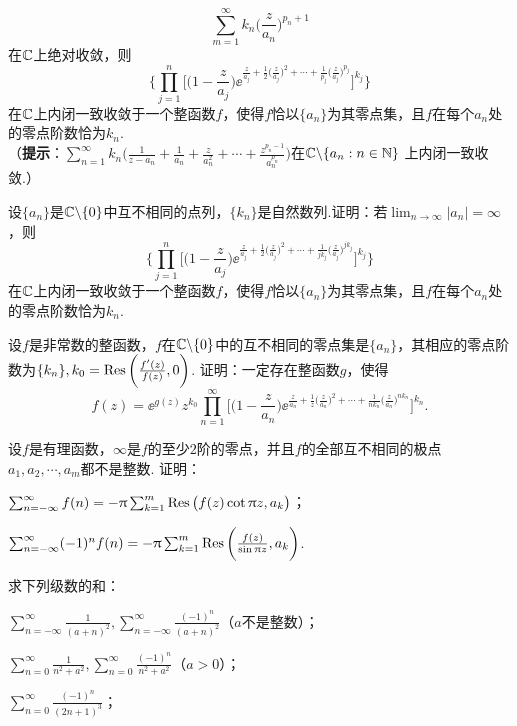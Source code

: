 \begin{xiti}
\[        \sum_{m=1}^\infty k_n\bigg(\frac z{a_n}\bigg)^{p_n+1}
      \]
      在$\mathbb C$上绝对收敛，则
      \[
        \bigg\{\prod_{j=1}^n\bigg[\bigg(1-\frac z{a_j}\bigg)\ee^{\frac z{a_j}+\frac12\big(\frac z{a_j}\big)^2+\cdots+\frac1{p_j}\big(\frac z{a_j}\big)^{p_j}}\bigg]^{k_j}\bigg\}
      \]
      在$\mathbb C$上内闭一致收敛于一个整函数$f$，使得$f$恰以$\{a_n\}$为其零点集，且$f$在每个$a_n$处的零点阶数恰为$k_n$.\\
      （\textbf{提示}：$\sum_{n=1}^\infty k_n\bigg(\frac1{z-a_n}+\frac1{a_n}
      +\frac z{a_n^2}+\cdots+\frac{z^{p_n-1}}{a_n^{p_n}}\bigg)$在$\mathbb C\backslash\{a_n:n\in\mathbb N\}$
      上内闭一致收敛.）
  \item 设$\{a_n\}$是$\mathbb C\backslash\{0\}$中互不相同的点列，$\{k_n\}$是自然数列.证明：若$\lim_{n\to\infty}|a_n|=\infty$，则
      \[
        \bigg\{\prod_{j=1}^n\bigg[\bigg(1-\frac z{a_j}\bigg)\ee^{\frac z{a_j}+\frac12\big(\frac z{a_j}\big)^2+\cdots+\frac1{jk_j}\big(\frac z{a_j}\big)^{jk_j}}\bigg]^{k_j}\bigg\}
      \]
      在$\mathbb C$上内闭一致收敛于一个整函数$f$，使得$f$恰以$\{a_n\}$为其零点集，且$f$在每个$a_n$处的零点阶数恰为$k_n$.
  \item 设$f$是非常数的整函数，$f$在$\mathbb C\backslash\{0\}$中的互不相同的零点集是$\{a_n\}$，其相应的零点阶数为$\{k_n\},k_0=\operatorname*{Res}\bigg(\frac{f'(z)}{f(z)},0\bigg)$. 证明：一定存在整函数$g$，使得
      \[
        f(z) = \ee^{g(z)}z^{k_0}\prod_{n=1}^\infty\bigg[\bigg(1-\frac z{a_n}\bigg)\ee^{\frac z{a_n} + \frac1z\big(\frac z{a_n}\big)^2
        + \cdots+\frac1{nk_n}\big(\frac z{a_n}\big)^{nk_n}}\bigg]^{k_n}.
      \]
  \item 设$f$是有理函数，$\infty$是$f$的至少$2$阶的零点，并且$f$的全部互不相同的极点$a_1,a_2,\cdots,a_m$都不是整数. 证明：
    \begin{enuma}
      \item $\sum_{n=-\infty}^\infty f(n)=-\uppi\sum_{k=1}^m\operatorname*{Res}\big(f(z)\cot\uppi z,a_k\big)$；
      \item $\sum_{n=-\infty}^\infty (-1)^nf(n)=-\uppi\sum_{k=1}^m\operatorname*{Res}\bigg(\frac{f(z)}{\sin\uppi z},a_k\bigg)$.
    \end{enuma}
  \item 求下列级数的和：
    \begin{enuma}
      \item $\sum_{n=-\infty}^\infty\frac1{(a+n)^2},\sum_{n=-\infty}^\infty
         \frac{(-1)^n}{(a+n)^2}$（$a$不是整数）；
      \item $\sum_{n=0}^\infty\frac1{n^2+a^2},\sum_{n=0}^\infty\frac{(-1)^n}{n^2+a^2}$（$a>0$）；
      \item $\sum_{n=0}^\infty\frac{(-1)^n}{(2n+1)^3}$；

\end{enuma}
\end{xiti}
